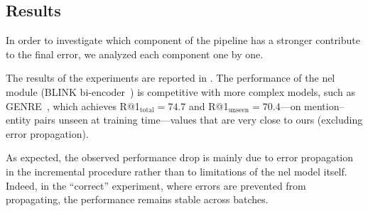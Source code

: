 \subsection{Results}
\label{sec:ijckg:results}
In order to investigate which component of the pipeline has a stronger contribute to the final error, we analyzed each component one by one.




The results of the experiments are reported in .
The performance of the \ac{nel} module (BLINK bi-encoder~\cite{blink}) is competitive with more complex models, such as GENRE~\cite{decao2021autoregressive}, which achieves R@1$_\text{total} = 74.7$ and R@1$_\text{unseen} = 70.4$---on mention--entity pairs unseen at training time---values that are very close to ours (excluding error propagation).

As expected, the observed performance drop is mainly due to error propagation in the incremental procedure rather than to limitations of the \ac{nel} model itself. 
Indeed, in the ``correct'' experiment, where errors are prevented from propagating, the performance remains stable across batches.

